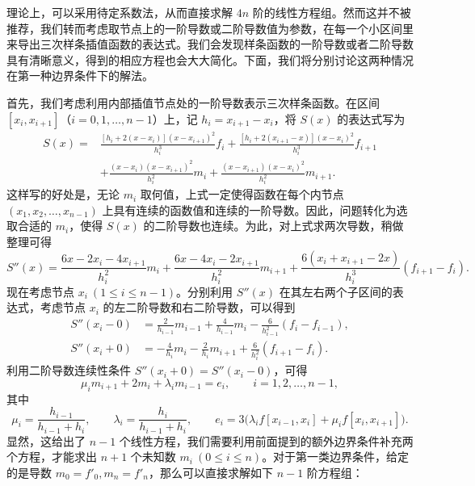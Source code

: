 理论上，可以采用待定系数法，从而直接求解 $4n$ 阶的线性方程组。然而这并不被推荐，我们转而考虑取节点上的一阶导数或二阶导数值为参数，在每一个小区间里来导出三次样条插值函数的表达式。我们会发现样条函数的一阶导数或者二阶导数具有清晰意义，得到的相应方程也会大大简化。下面，我们将分别讨论这两种情况在第一种边界条件下的解法。

首先，我们考虑利用内部插值节点处的一阶导数表示三次样条函数。在区间 $[x_i,x_{i+1}]$（$i=0,1,\ldots,n-1$）上，记 $h_i=x_{i+1}-x_i$，将 $S(x)$ 的表达式写为
\begin{equation}
\begin{aligned}
S(x)={}&\frac{[h_i+2(x-x_i)](x-x_{i+1})^2}{h_i^3}f_i
+\frac{[h_i+2(x_{i+1}-x)](x-x_i)^2}{h_i^3}f_{i+1}\\
&+\frac{(x-x_i)(x-x_{i+1})^2}{h_i^2}m_i
+\frac{(x-x_{i+1})(x-x_i)^2}{h_i^2}m_{i+1}.
\end{aligned}
\tag{2.1.20}
\end{equation}
这样写的好处是，无论 $m_i$ 取何值，上式一定使得函数在每个内节点 $(x_1,x_2,\ldots,x_{n-1})$ 上具有连续的函数值和连续的一阶导数。因此，问题转化为选取合适的 $m_i$，使得 $S(x)$ 的二阶导数也连续。为此，对上式求两次导数，稍做整理可得
\[
S''(x)=\frac{6x-2x_i-4x_{i+1}}{h_i^2}m_i
+\frac{6x-4x_i-2x_{i+1}}{h_i^2}m_{i+1}
+\frac{6(x_i+x_{i+1}-2x)}{h_i^3}(f_{i+1}-f_i).
\]
现在考虑节点 $x_i\ (1\le i\le n-1)$。分别利用 $S''(x)$ 在其左右两个子区间的表达式，考虑节点 $x_i$ 的左二阶导数和右二阶导数，可以得到
\begin{align}
S''(x_i-0)&=\frac{2}{h_{i-1}}m_{i-1}+\frac{4}{h_{i-1}}m_i-\frac{6}{h_{i-1}^2}(f_i-f_{i-1}),
\tag{2.1.21}\\
S''(x_i+0)&=-\frac{4}{h_i}m_i-\frac{2}{h_i}m_{i+1}+\frac{6}{h_i^2}(f_{i+1}-f_i).
\tag{2.1.22}
\end{align}
利用二阶导数连续性条件 $S''(x_i+0)=S''(x_i-0)$，可得
\begin{equation}
\mu_i m_{i+1}+2m_i+\lambda_i m_{i-1}=e_i,\qquad i=1,2,\ldots,n-1,
\tag{2.1.23}
\end{equation}
其中
\begin{equation}
\mu_i=\frac{h_{i-1}}{h_{i-1}+h_i},\qquad
\lambda_i=\frac{h_i}{h_{i-1}+h_i},\qquad
e_i=3\bigl(\lambda_i f[x_{i-1},x_i]+\mu_i f[x_i,x_{i+1}]\bigr).
\tag{2.1.24}
\end{equation}
显然，这给出了 $n-1$ 个线性方程，我们需要利用前面提到的额外边界条件补充两个方程，才能求出 $n+1$ 个未知数 $m_i\ (0\le i\le n)$。对于第一类边界条件，给定的是导数 $m_0=f'_0,m_n=f'_n$，那么可以直接求解如下 $n-1$ 阶方程组：

